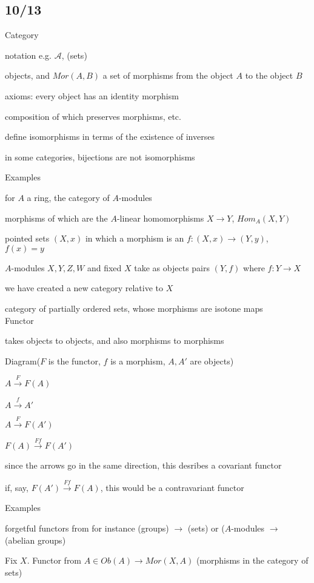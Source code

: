\documentclass[12pt]{article}
\begin{document}
\subsection{10/13}

\noindent
Category

notation e.g. $\mathcal{A}$, (sets)

objects, and $Mor(A, B)$ a set of morphisms from the object $A$ to the object $B$

axioms: every object has an identity morphism

composition of which preserves morphisms, etc.

define isomorphisms in terms of the existence of inverses

in some categories, bijections are not isomorphisms

\noindent
Examples

for $A$ a ring, the category of $A$-modules

morphisms of which are the $A$-linear homomorphisms $X \to Y$, $Hom_A(X, Y)$

pointed sets $(X, x)$ in which a morphism is an $f:(X, x) \to (Y, y)$, $f(x) = y$

$A$-modules $X, Y, Z, W$ and fixed $X$ take as objects pairs $(Y, f)$ where $f: Y \to X$

we have created a new category relative to $X$

category of partially ordered sets, whose morphisms are isotone maps\\

\noindent
Functor

takes objects to objects, and also morphisms to morphisms

\noindent
Diagram($F$ is the functor, $f$ is a morphism, $A, A'$ are objects)

$A \xrightarrow{F} F(A)$

$A \xrightarrow{f} A'$

$A \xrightarrow{F} F(A')$

$F(A) \xrightarrow{Ff} F(A')$

since the arrows go in the same direction, this desribes a covariant functor

if, say, $F(A') \xrightarrow{Ff} F(A)$, this would be a contravariant functor

\noindent
Examples

forgetful functors from for instance (groups) $\to$ (sets) or ($A$-modules $\to$ (abelian groups)

Fix $X$. Functor from $A \in Ob(A) \to Mor(X, A)$ (morphisms in the category of sets)
\end{document}
